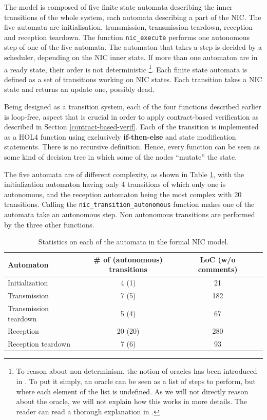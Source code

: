 \documentclass{kththesis}
\begin{document}
{The model is composed of five finite state automata describing the inner transitions of the whole system, each automata describing a part of the NIC. The five automata are initialisation, transmission, transmission teardown, reception and reception teardown. The function \texttt{nic\_execute} performs one autonomous step of one of the five automata. The automaton that takes a step is decided by a scheduler, depending on the NIC inner state. If more than one automaton are in a ready state, their order is not deterministic \footnote{To reason about non-determinism, the notion of oracles has been introduced in \cite{haglund_formal_2016}. To put it simply, an oracle can be seen as a list of steps to perform, but where each element of the list is undefined. As we will not directly reason about the oracle, we will not explain how this works in more details. The reader can read a thorough explanation in \cite{haglund_formal_2016}.}. Each finite state automata is defined as a set of transitions working on NIC states. Each transition takes a NIC state and returns an update one, possibly dead.

Being designed as a transition system, each of the four functions described earlier is loop-free, aspect that is crucial in order to apply contract-based verification as described in Section \ref{contract-based-verif}. Each of the transition is implemented as a HOL4 function using exclusively \textbf{if-then-else} and state modification statements. There is no recursive definition. Hence, every function can be seen as some kind of decision tree in which some of the nodes ``mutate'' the state. %

The five automata are of different complexity, as shown in Table \ref{stats_complexity_formal_nic_model}, with the initialization automaton having only 4 transitions of which only one is autonomous, and the reception automaton being the most complex with 20 transitions. Calling the \texttt{nic\_transition\_autonomous} function makes one of the automata take an autonomous step. Non autonomous transitions are performed by the three other functions.

\begin{table}[ht!]
    \centering
    \begin{tabular}{ | l | c | c | c | }
        \hline
        Automaton & \# of (autonomous) transitions & LoC (w/o comments)\\
        \hline
        Initialization & 4 (1) & 21\\
        Transmission & 7 (5) & 182\\
        Transmission teardown & 5 (4) & 67\\
        Reception & 20 (20) & 280\\
        Reception teardown & 7 (6) & 93\\
        \hline
    \end{tabular}
    \caption{Statistics on each of the automata in the formal NIC model.}
    \label{stats_complexity_formal_nic_model}
\end{table}

}
\end{document}
